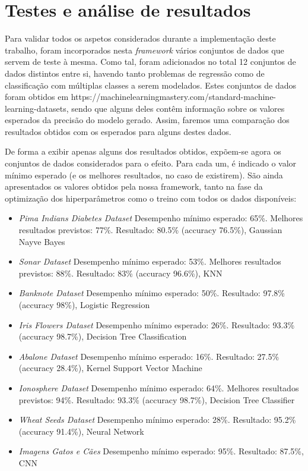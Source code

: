 \documentclass[a4paper]{report}
\begin{document}
\chapter{Testes e análise de resultados} \label{ch:Test&Analysis}
\large{
	Para validar todos os aspetos considerados durante a implementação deste trabalho, foram incorporados nesta \textit{framework} vários conjuntos de dados que servem de teste à mesma.
	Como tal, foram adicionados no total 12 conjuntos de dados distintos entre si, havendo tanto problemas de regressão como de classificação com múltiplas classes a serem modelados.
	Estes conjuntos de dados foram obtidos em https://machinelearningmastery.com/standard-machine-learning-datasets, sendo que alguns deles contêm informação sobre os valores esperados da precisão do modelo gerado. Assim, faremos uma comparação dos resultados obtidos com os esperados para alguns destes dados.

	De forma a exibir apenas alguns dos resultados obtidos, expõem-se agora os conjuntos de dados considerados para o efeito. Para cada um, é indicado o valor mínimo esperado (e os melhores resultados, no caso de existirem). São ainda apresentados os valores obtidos pela nossa framework, tanto na fase da optimização dos hiperparâmetros como o treino com todos os dados disponíveis:
	\begin{itemize}
		\item \textsl{Pima Indians Diabetes Dataset}
		Desempenho mínimo esperado: 65\%. Melhores resultados previstos: 77\%.
		Resultado: 80.5\% (accuracy 76.5\%), Gaussian Nayve Bayes
		\item \textsl{Sonar Dataset}
		Desempenho mínimo esperado: 53\%. Melhores resultados previstos: 88\%.
		Resultado: 83\% (accuracy 96.6\%), KNN
		\item \textsl{Banknote Dataset}
		Desempenho mínimo esperado: 50\%.
		Resultado: 97.8\% (accuracy 98\%), Logistic Regression 
		\item \textsl{Iris Flowers Dataset}
		Desempenho mínimo esperado: 26\%.
		Resultado: 93.3\% (accuracy 98.7\%), Decision Tree Classification
		\item \textsl{Abalone Dataset}
		Desempenho mínimo esperado: 16\%.
		Resultado: 27.5\% (accuracy 28.4\%), Kernel Support Vector Machine
		\item \textsl{Ionosphere Dataset}
		Desempenho mínimo esperado: 64\%. Melhores resultados previstos: 94\%.
		Resultado: 93.3\% (accuracy 98.7\%), Decision Tree Classifier
		\item \textsl{Wheat Seeds Dataset}
		Desempenho mínimo esperado: 28\%.
		Resultado: 95.2\% (accuracy 91.4\%), Neural Network
		\item \textsl{Imagens Gatos e Cães}
		Desempenho mínimo esperado: 95\%.
		Resultado: 87.5\%, CNN
	\end{itemize}

}
\end{document}
